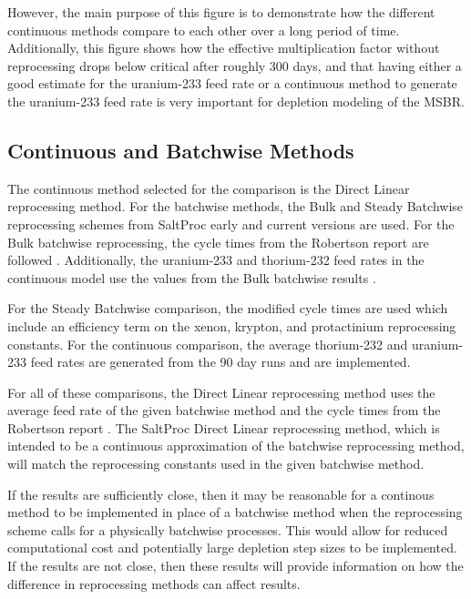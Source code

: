 However, the main purpose of this figure is to demonstrate how the different continuous methods compare to each other over a long period of time. Additionally, this figure shows how the effective multiplication factor without reprocessing drops below critical after roughly 300 days, and that having either a good estimate for the uranium-233 feed rate or a continuous method to generate the uranium-233 feed rate is very important for depletion modeling of the MSBR.


\subsection{Continuous and Batchwise Methods}

The continuous method selected for the comparison is the Direct Linear reprocessing method. For the batchwise methods, the Bulk and Steady Batchwise reprocessing schemes from SaltProc early and current versions are used. For the Bulk batchwise reprocessing, the cycle times from the Robertson report are followed \cite{robertson_conceptual_1971}. Additionally, the uranium-233 and thorium-232 feed rates in the continuous model use the values from the Bulk batchwise results \cite{rykhlevskii_advanced_2018}.

For the Steady Batchwise comparison, the modified cycle times are used which include an efficiency term on the xenon, krypton, and protactinium reprocessing constants. For the continuous comparison, the average thorium-232 and uranium-233 feed rates are generated from the 90 day runs and are implemented.

For all of these comparisons, the Direct Linear reprocessing method uses the average feed rate of the given batchwise method and the cycle times from the Robertson report \cite{robertson_conceptual_1971}. The SaltProc Direct Linear reprocessing method, which is intended to be a continuous approximation of the batchwise reprocessing method, will match the reprocessing constants used in the given batchwise method.

If the results are sufficiently close, then it may be reasonable for a continous method to be implemented in place of a batchwise method when the reprocessing scheme calls for a physically batchwise processes. This would allow for reduced computational cost and potentially large depletion step sizes to be implemented. If the results are not close, then these results will provide information on how the difference in reprocessing methods can affect results.


